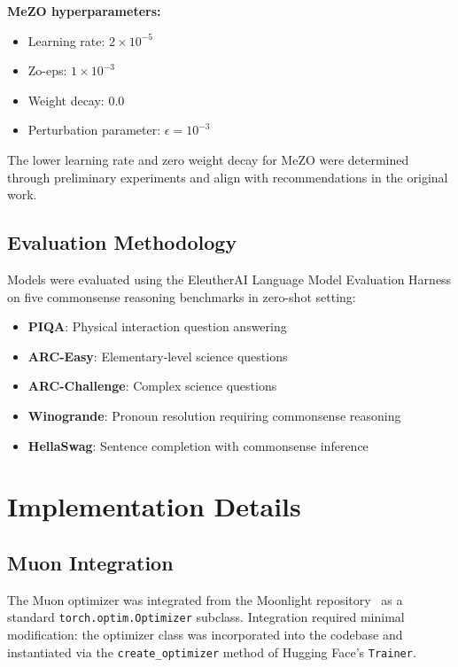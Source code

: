 \documentclass{article}
\begin{document}
\textbf{MeZO hyperparameters:}
\begin{itemize}
    \item Learning rate: $2 \times 10^{-5}$
    \item Zo-eps: $1 \times 10^{-3}$
    \item Weight decay: 0.0
    \item Perturbation parameter: $\epsilon = 10^{-3}$
\end{itemize}

The lower learning rate and zero weight decay for MeZO were determined through preliminary experiments and align with recommendations in the original work.

\subsection{Evaluation Methodology}

Models were evaluated using the EleutherAI Language Model Evaluation Harness on five commonsense reasoning benchmarks in zero-shot setting:

\begin{itemize}
\item \textbf{PIQA}: Physical interaction question answering
\item \textbf{ARC-Easy}: Elementary-level science questions
\item \textbf{ARC-Challenge}: Complex science questions
\item \textbf{Winogrande}: Pronoun resolution requiring commonsense reasoning
\item \textbf{HellaSwag}: Sentence completion with commonsense inference
\end{itemize}

\section{Implementation Details}

\subsection{Muon Integration}

The Muon optimizer was integrated from the Moonlight repository~\cite{moonshot2025moonlight} as a standard \texttt{torch.optim.Optimizer} subclass. Integration required minimal modification: the optimizer class was incorporated into the codebase and instantiated via the \texttt{create\_optimizer} method of Hugging Face's \texttt{Trainer}.
\end{document}
